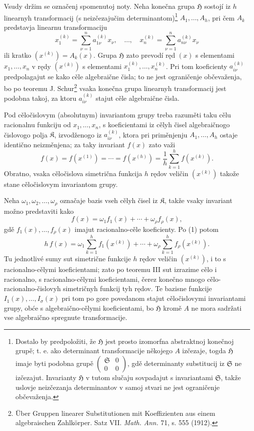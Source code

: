 \documentclass[11pt]{article}
\providecommand{\frH}{\mathfrak H}
\providecommand{\frK}{\mathfrak K}
\providecommand{\frS}{\mathfrak S}
\begin{document}
Vsudy držim se označenj spomenutoj noty. Neha konečna grupa \(\frH\) sostojí iz \(h\) linearnyh transformacij (s neizčezajučim determinantom)\footnote{Dostalo by predpoložiti, že \(\frH\) jest prosto izomorfna abstraktnoj konečnoj grupě; t. e. ako determinant transformacije někojego \(A\) izčezaje, togda \(\frH\) imaje byti podobna grupě \(\begin{pmatrix}\frS&0\\0&0\end{pmatrix}\), gdě determinanty substitucij iz \(\frS\) ne izčezajut. Invarianty \(\frH\) v tutom slučaju sovpadajut s invariantami \(\frS\), takže uslovje neizčezanja determinantov v samoj stvari ne jest ograničenje občevaženja.} \(A_1,\ldots,A_h\), pri čem \(A_k\) predstavja linearnu transformaciju
\[
        x_1^{(k)}=\sum_{\nu=1}^{n}a_{1\nu}^{(k)}x_\nu,
        \quad\ldots,\quad
        x_n^{(k)}=\sum_{\nu=1}^{n}a_{n\nu}^{(k)}x_\nu
\]
ili kratko \((x^{(k)})=A_k(x)\). Grupa \(\frH\) zato prevodí ręd \((x)\) s elementami \(x_1,\ldots,x_n\) v rędy \((x^{(k)})\) s elementami \(x_1^{(k)},\ldots,x_n^{(k)}\). Pri tom koeficienty \(a_{i\nu}^{(k)}\) predpolagajut se kako cěle algebraične čisla; to ne jest ograničenje občevaženja, bo po teoremu J. Schur\footnote{Über Gruppen linearer Substitutionen mit Koeffizienten aus einem algebraischen Zahlkörper. Satz VII. \emph{Math. Ann.} 71, s. 555 (1912).} vsaka konečna grupa linearnyh transformacij jest podobna takoj, za ktoru \(a_{i\nu}^{(k)}\) stajut cěle algebraične čisla.

Pod cěločislovym (absolutnym) invariantom grupy treba razuměti taku cělu racionalnu funkciju od \(x_1,\ldots,x_n\), s koeficientami iz cělyh čisel algebraičnogo čislovogo polja \(\frK\), izvodženogo iz \(a_{i\nu}^{(k)}\), ktora pri priměnjenju \(A_1,\ldots,A_h\) ostaje identično neizměnjena; za taky invariant \(f(x)\) zato važi
\begin{equation}
        f(x)=f(x^{(1)})=\cdots=f(x^{(h)})
        =\frac1h\sum_{k=1}^{h}f(x^{(k)}).
\end{equation}
Obratno, vsaka cěločislova simetrična funkcija \(h\) rędov veličin \((x^{(k)})\) takože stane cěločislovym invariantom grupy.

Neha \(\omega_1,\omega_2,\ldots,\omega_\rho\) označaje bazis vseh cělyh čisel iz \(\frK\), takže vsaky invariant možno predstaviti kako
\[
        f(x)=\omega_1 f_1(x)+\cdots+\omega_\rho f_\rho(x),
\]
gdě \(f_1(x),\ldots,f_\rho(x)\) imajut racionalno-cěle koeficienty. Po (1) potom
\[
        h\,f(x)
        =
        \omega_1\sum_{k=1}^{h}f_1(x^{(k)})
        +\cdots+
        \omega_\rho\sum_{k=1}^{h}f_\rho(x^{(k)}).
\]
Tu jednotlivé sumy sut simetrične funkcije \(h\) rędov veličin \((x^{(k)})\), i to s racionalno-cělymi koeficientami; zato po teoremu III sut izrazime cělo i racionalno, s racionalno-cělymi koeficientami, čerez konečno mnogo cělo-racionalno-čislovyh simetričnyh funkcij tyh rędov. Te bazisne funkcije \(I_1(x),\ldots,I_\sigma(x)\) pri tom po gore povedanom stajut cěločislovymi invariantami grupy, obće s algebraično-cělymi koeficientami, bo \(\frH\) kromě \(A\) ne mora sadržati vse algebraično spregnute transformacije.
\end{document}
